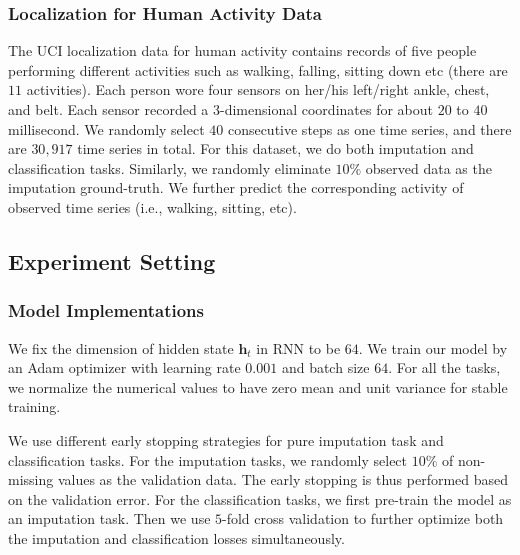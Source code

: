 \documentclass{article}
\newcommand{\h}{{\mathbf h}}
\begin{document}
\subsubsection{Localization for Human Activity Data}
The UCI localization data for human activity \cite{kaluvza2010agent} contains records of five people performing different activities such as  walking, falling, sitting down etc (there are $11$ activities). Each person wore four sensors on her/his left/right ankle, chest, and belt. Each sensor recorded a 3-dimensional coordinates for about $20$ to $40$  millisecond. We randomly select $40$ consecutive steps as one time series, and there are $30,917$ time series in total. For this dataset, we do both imputation and classification tasks. Similarly, we randomly eliminate $10\%$ observed data as the imputation ground-truth. We further predict the corresponding activity of observed time series (i.e., walking, sitting, etc).

\subsection{Experiment Setting}
\label{exp_setting}

\subsubsection{Model Implementations}
We fix the dimension of hidden state $\h_t$ in RNN to be $64$. We train our model by an Adam optimizer with learning rate $0.001$ and batch size $64$. For all the tasks, we normalize the numerical values to have zero mean and unit variance for stable training. 

We use different early stopping strategies for pure imputation task and classification tasks. For the imputation tasks, we randomly select $10\%$ of non-missing values as the validation data. The early stopping is thus performed based on the validation error.
For the classification tasks, we first pre-train the model as an imputation task. Then we use $5$-fold cross validation to further optimize both the imputation and classification losses simultaneously.
\end{document}
